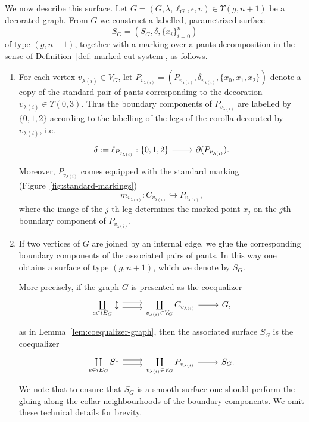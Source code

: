 \documentclass{amsart}
\theoremstyle{definition}
\numberwithin{equation}{section}
\begin{document}
We now describe this surface.  Let $G=(G,\lambda,\ell_G,\epsilon,\underline{\upsilon})\in \Upsilon(g,n+1)$
be a decorated graph. From $G$ we construct a labelled, parametrized surface
\[
S_G=(S_G,\delta,\{x_i\}_{i=0}^n)
\]
of type $(g,n+1)$, together with a marking over a pants decomposition in the
sense of Definition~\ref{def: marked cut system}, as follows.
\begin{enumerate}
    \item For each vertex $v_{\lambda(i)}\in V_G$, let $P_{v_{\lambda(i)}}=(P_{v_{\lambda(i)}},\delta_{v_{\lambda(i)}},\{x_0,x_1,x_2\})$ denote a copy of the standard pair of pants corresponding to the decoration $\upsilon_{\lambda(i)}\in \Upsilon(0,3).$ Thus the boundary components of $P_{v_{\lambda(i)}}$ are labelled by $\{0,1,2\}$ according to the labelling of the legs of the corolla decorated by $\upsilon_{\lambda(i)}$, i.e.  \[
    \begin{tikzcd}
    \delta := \ell_{P_{v_{\lambda(i)}}}: \{0,1,2\} \arrow[r] & \partial(P_{v_{\lambda(i)}}).
    \end{tikzcd}
    \] Moreover, $P_{v_{\lambda(i)}}$ comes equipped with the standard marking (Figure~\ref{fig:standard-markings})
\[
m_{v_{\lambda(i)}}:C_{v_{\lambda(i)}}\hookrightarrow P_{v_{\lambda(i)}},
\]
where the image of the $j$-th leg determines the marked point $x_j$ on the $j$th boundary component of $P_{v_{\lambda(i)}}$. 

    
\item If two vertices of $G$ are joined by an internal edge, we glue the corresponding boundary components of the associated pairs of pants. In this way one obtains a surface of type $(g,n+1)$, which we denote by $S_G$. 

    More precisely, if the graph $G$ is presented as the coequalizer
    \[
    \begin{tikzcd}
        \coprod\limits_{e\in iE_G}\updownarrow 
        \arrow[r, shift left=1.2] 
        \arrow[r, shift right=1.2]
        & 
        \coprod\limits_{v_{\lambda(i)}\in V_G} C_{v_{\lambda(i)}} 
        \arrow[r] 
        & 
        G,
    \end{tikzcd}
    \]
    as in Lemma~\ref{lem:coequalizer-graph}, then the associated surface $S_G$ is the coequalizer
    \[
    \begin{tikzcd}
        \coprod\limits_{e\in iE_G} S^1 
        \arrow[r, shift left=1.2] 
        \arrow[r, shift right=1.2]
        & 
        \coprod\limits_{v_{\lambda(i)}\in V_G} P_{v_{\lambda(i)}} 
        \arrow[r] 
        & 
        S_G.
    \end{tikzcd}
    \]
We note that to ensure that $S_G$ is a smooth surface one should perform the gluing along the collar neighbourhoods of the boundary components. We omit these technical details for brevity. 


\end{enumerate}
\end{document}
